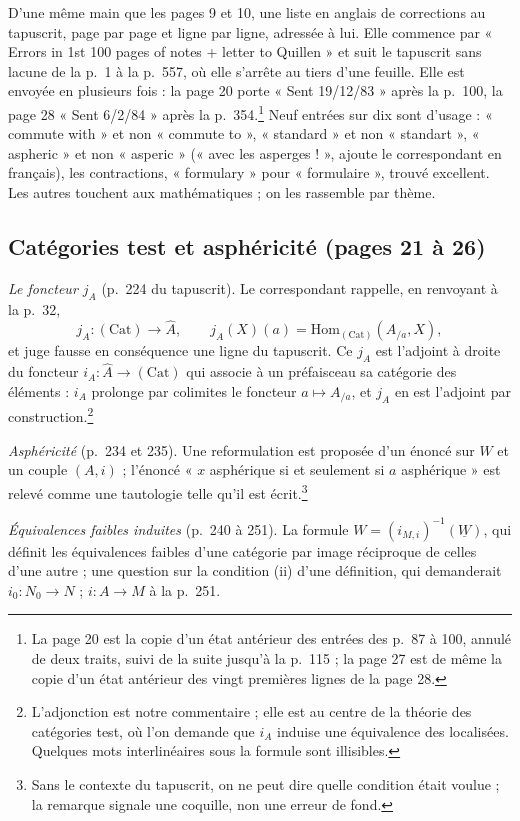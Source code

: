 \documentclass[11pt,a4paper]{article}
\begin{document}
D'une même main que les pages 9 et 10, une liste en anglais de corrections au
tapuscrit, page par page et ligne par ligne, adressée à lui. Elle commence
par « Errors in 1st 100 pages of notes + letter to Quillen » et suit le
tapuscrit sans lacune de la p.\ 1 à la p.\ 557, où elle s'arrête au tiers d'une
feuille. Elle est envoyée en plusieurs fois : la page 20 porte « Sent
19/12/83 » après la p.\ 100, la page 28 « Sent 6/2/84 » après la
p.\ 354.\footnote{La page 20 est la copie d'un état antérieur des entrées des
p.\ 87 à 100, annulé de deux traits, suivi de la suite jusqu'à la p.\ 115 ; la
page 27 est de même la copie d'un état antérieur des vingt premières lignes de
la page 28.} Neuf entrées sur dix sont d'usage : « commute with » et non
« commute to », « standard » et non « standart », « aspheric » et non
« asperic » (« avec les asperges ! », ajoute le correspondant en français),
les contractions, « formulary » pour « formulaire », trouvé excellent. Les
autres touchent aux mathématiques ; on les rassemble par thème.

\subsection*{Catégories test et asphéricité (pages 21 à 26)}

\emph{Le foncteur $j_{A}$} (p.\ 224 du tapuscrit). Le correspondant rappelle,
en renvoyant à la p.\ 32,
\[
j_{A} : (\mathrm{Cat}) \longrightarrow \widehat{A}, \qquad
j_{A}(X)(a) = \mathrm{Hom}_{(\mathrm{Cat})}(A_{/a}, X),
\]
et juge fausse en conséquence une ligne du tapuscrit. Ce $j_{A}$ est l'adjoint
à droite du foncteur $i_{A} : \widehat{A} \to (\mathrm{Cat})$ qui associe à
un préfaisceau sa catégorie des éléments : $i_{A}$ prolonge par colimites le
foncteur $a \mapsto A_{/a}$, et $j_{A}$ en est l'adjoint par
construction.\footnote{L'adjonction est notre commentaire ; elle est au
centre de la théorie des catégories test, où l'on demande que $i_{A}$ induise
une équivalence des localisées. Quelques mots interlinéaires sous la formule
sont illisibles.}

\emph{Asphéricité} (p.\ 234 et 235). Une reformulation est proposée d'un
énoncé sur $W$ et un couple $(A, i)$ ; l'énoncé « $x$ asphérique si et
seulement si $a$ asphérique » est relevé comme une tautologie telle qu'il est
écrit.\footnote{Sans le contexte du tapuscrit, on ne peut dire quelle
condition était voulue ; la remarque signale une coquille, non une erreur de
fond.}

\emph{Équivalences faibles induites} (p.\ 240 à 251). La formule
$W = (i_{M,i})^{-1}(\underline{W})$, qui définit les équivalences faibles
d'une catégorie par image réciproque de celles d'une autre ; une question
sur la condition (ii) d'une définition, qui demanderait $i_{0} : N_{0} \to N$ ;
$i : A \to M$ à la p.\ 251.
\end{document}

